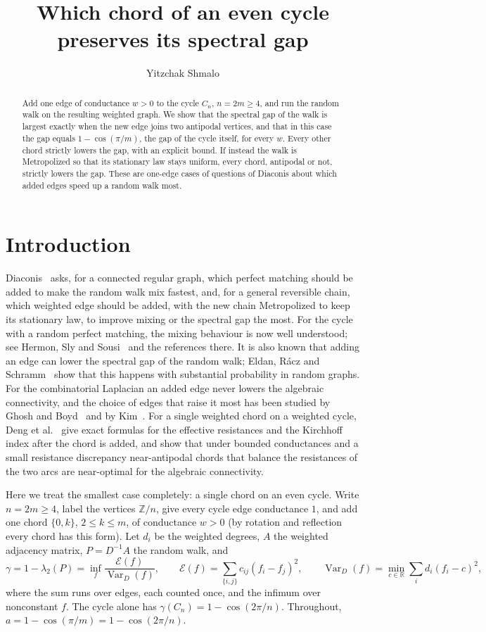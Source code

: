 \documentclass[11pt]{amsart}
\title{Which chord of an even cycle preserves its spectral gap}
\author{Yitzchak Shmalo}
\date{}
\theoremstyle{remark}
\begin{document}
\begin{abstract}
Add one edge of conductance $w>0$ to the cycle $C_n$, $n=2m\ge4$, and run the random walk on the resulting weighted
graph. We show that the spectral gap of the walk is largest exactly when the new edge joins two antipodal vertices,
and that in this case the gap equals $1-\cos(\pi/m)$, the gap of the cycle itself, for every $w$. Every other chord
strictly lowers the gap, with an explicit bound. If instead the walk is Metropolized so that its stationary law stays
uniform, every chord, antipodal or not, strictly lowers the gap. These are one-edge cases of questions of Diaconis
about which added edges speed up a random walk most.
\end{abstract}

\maketitle

\section{Introduction}

Diaconis~\cite[Section~5, Question~4]{Diaconis} asks, for a connected regular graph, which perfect matching should
be added to make the random walk mix fastest, and, for a general reversible chain, which weighted edge should be added,
with the new chain Metropolized to keep its stationary law, to improve mixing or the spectral gap the most. For the
cycle with a random perfect matching, the mixing behaviour is now well understood; see Hermon, Sly and
Sousi~\cite{HSS} and the references there. It is also known that adding an edge can lower the spectral gap of the
random walk; Eldan, R\'acz and Schramm~\cite{ERS} show that this happens with substantial probability in random graphs.
For the combinatorial Laplacian an added edge never lowers the algebraic connectivity, and the choice of edges
that raise it most has been studied by Ghosh and Boyd~\cite{GB} and by Kim~\cite{Kim}. For a single weighted chord
on a weighted cycle, Deng et al.~\cite{DCY} give exact formulas for the effective resistances
and the Kirchhoff index after the chord is added, and show that under bounded conductances and a small resistance discrepancy near-antipodal chords that
balance the resistances of the two arcs are near-optimal for the algebraic connectivity.

Here we treat the smallest case completely: a single chord on an even cycle. Write $n=2m\ge4$, label the vertices
$\mathbb Z/n$, give every cycle edge conductance $1$, and add one chord $\{0,k\}$, $2\le k\le m$, of conductance $w>0$
(by rotation and reflection every chord has this form). Let $d_i$ be the weighted degrees, $A$ the weighted adjacency
matrix, $P=D^{-1}A$ the random walk, and
\[
\gamma=1-\lambda_2(P)=\inf_f\frac{\mathcal E(f)}{\operatorname{Var}_D(f)},\qquad
\mathcal E(f)=\sum_{\{i,j\}}c_{ij}(f_i-f_j)^2,\qquad \operatorname{Var}_D(f)=\min_{c\in\mathbb R}\sum_id_i(f_i-c)^2,
\]
where the sum runs over edges, each counted once, and the infimum over nonconstant $f$. The cycle alone has
$\gamma(C_n)=1-\cos(2\pi/n)$. Throughout, $a=1-\cos(\pi/m)=1-\cos(2\pi/n)$.
\end{document}
